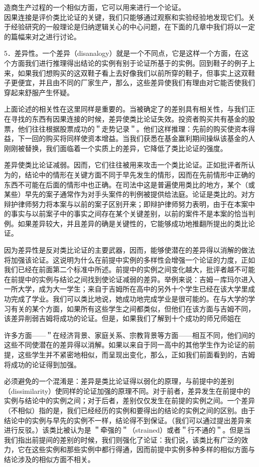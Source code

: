 造商生产过程的一个相似方面，它可以用来进行一个论证。\\
因果连接是评价类比论证的关键，我们只能够通过观察和实验经验地发现它们。关于经验研究的一般理论是归纳逻辑关心的中心问题，在下面的几章中我们将以一定的篇幅来对之进行讨论。

5．差异性。一个差异（disanalogy）就是一个不同点，它是这样一个方面，在这个方面我们进行推理得出结论的实例有别于论证所基于的实例。回到鞋子的例子上来，如果我们想购买的这双鞋子看上去好像我们以前所穿的鞋子，但事实上这双鞋子更便宜，并且由不同的厂家生产，那么，这些差异使我们有理由对它能否使我们穿起来舒服产生怀疑。

上面论述的相关性在这里同样是重要的。当被确定了的差别具有相关性，与我们正在寻找的东西有因果连接的时候，差异使类比论证失效。投资者购买共有基金的股票，他们往往根据股票成功的＂走势记录＂。他们这样推理：先前的购买使资本得益，下一回的购买将同样使资本增益。当我们获悉在基金赢利期间操纵该基金的人刚刚被替换，我们面临着一个实质上的差异，它降低了类比论证的强度。

差异使类比论证减弱。因而，它们往往被用来攻击一个类比论证。正如批评者所认为的，结论中的情形在关键方面不同于早先发生的情形，因而在先前情形中正确的东西不可能在后面的情形中也正确。在司法中这是普遍使用类比的地方，某个（或某些）早先的案子通常作为对手头案件的判例被提供给法庭。论证是类比的。对方辩护律师努力将本案与以前的案子区别开来；即辩护律师努力表明，由于在本案中的事实与以前案子中的事实之间存在某个关键差别，以前的案件不是本案的恰当判例。如果差异较大，并且差异的确是关键性的，它能够成功地推翻所提出的类比论证。

因为差异性是反对类比论证的主要武器，因而，能够使潜在的差异得以消解的做法将加强该论证。这说明为什么在前提中实例的多样性会增强一个论证的力度，正如我们已经在前面第二个标准中所述。前提中的实例之间变化越大，批评者越不可能在前提中的实例与结论之间找到使论证减弱的差异。举例来说：吉姆－库玛尔进入一所大学，成为大一学生；来自于吉姆所在高中的另外十个学生已经在该大学里成功完成了学业。我们可以类比地说，她成功地完成学业是很可能的。在与大学的学习有关的某个方面，如果所有这些学生之间都类似，但他们在该方面与吉姆不同，该差异削弱吉姆将成功的论证。但是，如果我们了解到十个成功的师兄师姐在

许多方面——＂在经济背景、家庭关系、宗教背景等方面——相互不同，他们间的这些不同使潜在的差异得以消解。如果以来自于同一高中的其他学生作为论证的前提，这些学生并不紧密地相似，而呈现出变化，那么，正如我们前面看到的，吉姆将成功的论证得到加强。

必须避免的一个混淆是：差异是类比论证得以弱化的原理，与前提中的差别（dissimilarity）使同样的论证加强的原理不同。对于前者，差异发生在前提中的实例与结论中的实例之间；对于后者，差别仅仅发生在前提的实例之间。一个差异（不相似）指的是，我们已经经历的实例和要得出的结论的实例之间的区别。由于结论中的实例与早先的实例不一样，结论得不到保证。（我们可以通过提出差异来进行反驳。）该类比被认为是 ＂牵强的＂（strained）或者＂行不通的＂。但是当我们指出前提间的差别的时候，我们则强化了论证：我们说，该类比有广泛的效力，它在这些实例和那些实例中都行得通，因而前提中实例多种多样的相似方面与结论涉及的相似方面不相关。

